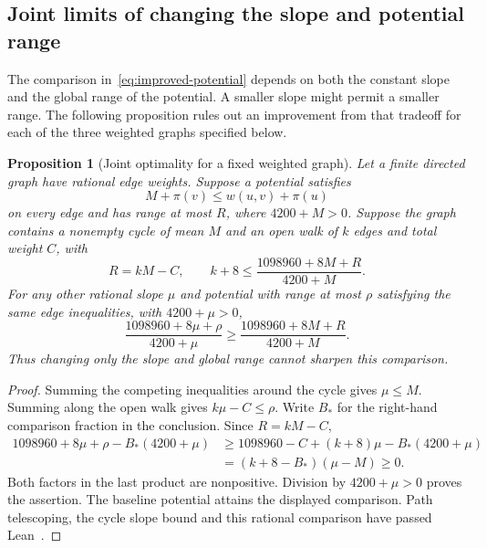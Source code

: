 \documentclass[11pt,a4paper]{article}
\newtheorem{proposition}[theorem]{Proposition}
\theoremstyle{definition}
\theoremstyle{remark}
\begin{document}
\subsection{Joint limits of changing the slope and potential range}\label{sec:joint-optimality}
The comparison in~\eqref{eq:improved-potential} depends on both the constant
slope and the global range of the potential. A smaller slope might permit
a smaller range. The following proposition rules out an improvement from
that tradeoff for each of the three weighted graphs specified below.

\begin{proposition}[Joint optimality for a fixed weighted graph]\label{prop:joint-potential-optimality}
Let a finite directed graph have rational edge weights. Suppose a potential
satisfies
\[
M+\pi(v)\le w(u,v)+\pi(u)
\]
on every edge and has range at most $R$, where $4200+M>0$. Suppose the graph
contains a nonempty cycle of mean $M$ and an open walk of $k$ edges and total
weight $C$, with
\[
R=kM-C,\qquad
k+8\le\frac{1098960+8M+R}{4200+M}.
\]
For any other rational slope $\mu$ and potential with range at most $\rho$
satisfying the same edge inequalities, with $4200+\mu>0$,
\[
\frac{1098960+8\mu+\rho}{4200+\mu}
\ge\frac{1098960+8M+R}{4200+M}.
\]
Thus changing only the slope and global range cannot sharpen this comparison.
\end{proposition}
\begin{proof}
Summing the competing inequalities around the cycle gives $\mu\le M$.
Summing along the open walk gives $k\mu-C\le\rho$. Write $B_*$ for the
right-hand comparison fraction in the conclusion. Since $R=kM-C$,
\[
\begin{aligned}
1098960+8\mu+\rho-B_*(4200+\mu)
&\ge1098960-C+(k+8)\mu-B_*(4200+\mu)\\
&=(k+8-B_*)(\mu-M)\ge0.
\end{aligned}
\]
Both factors in the last product are nonpositive. Division by
$4200+\mu>0$ proves the assertion. The baseline potential attains the
displayed comparison. Path telescoping, the cycle slope bound and this
rational comparison have passed Lean~\cite{potentialcomparisonarchive}.
\end{proof}
\end{document}
